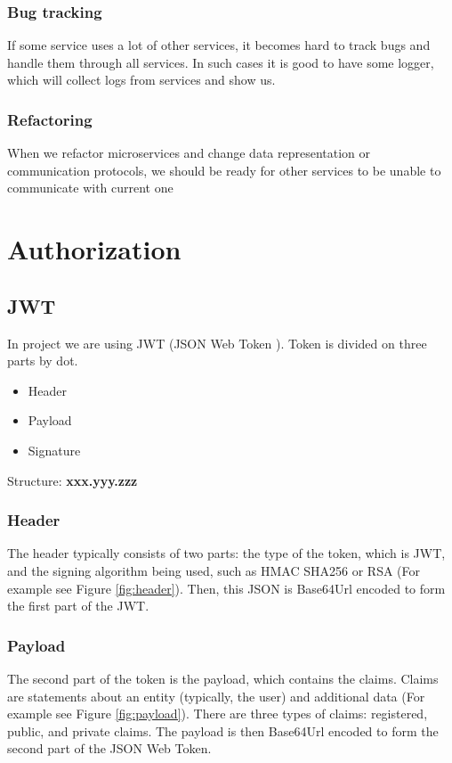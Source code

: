 		\subsubsection{Bug tracking}
		If some service uses a lot of other services, it becomes hard to track bugs and handle them through all services. In such cases it is good to have some logger, which will collect logs from services and show us.
		\subsubsection{Refactoring}
		When we refactor microservices and change data representation or communication protocols, we should be ready for other services to be unable to communicate with current one
\section{Authorization}
	\subsection{JWT}
	In project we are using JWT (JSON Web Token \cite{JWT}). Token is divided on three parts by dot.
	\begin{itemize}
		\item Header
		\item Payload
		\item Signature
	\end{itemize}
	
	Structure: \textbf{xxx.yyy.zzz}
	
	\subsubsection{Header}
	The header typically consists of two parts: the type of the token, which is JWT, and the signing algorithm being used, such as HMAC SHA256 or RSA (For example see Figure \ref{fig:header}). Then, this JSON is Base64Url encoded to form the first part of the JWT.
	
	
		
	
	
	
	\subsubsection{Payload}
	The second part of the token is the payload, which contains the claims. Claims are statements about an entity (typically, the user) and additional data (For example see Figure \ref{fig:payload}). There are three types of claims: registered, public, and private claims. The payload is then Base64Url encoded to form the second part of the JSON Web Token.
	
